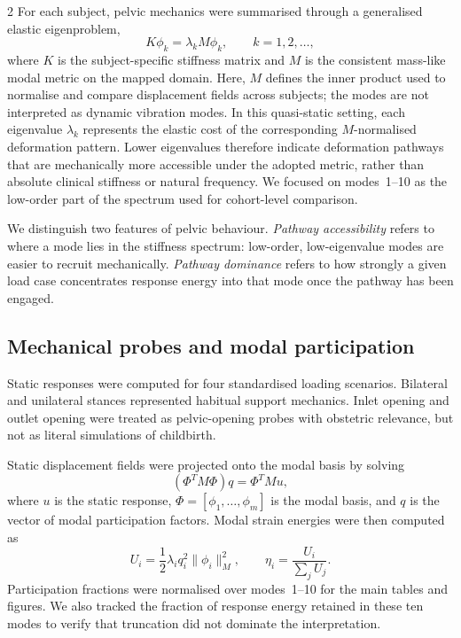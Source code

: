 \documentclass[openacc]{rsproca_new}
\begin{document}
\begin{multicols}{2}
For each subject, pelvic mechanics were summarised through a generalised elastic eigenproblem,
\begin{equation}
K\phi_{k} = \lambda_{k} M\phi_{k}, \qquad k=1,2,\ldots,
\end{equation}
where $K$ is the subject-specific stiffness matrix and $M$ is the consistent mass-like modal metric on the mapped domain. Here, $M$ defines the inner product used to normalise and compare displacement fields across subjects; the modes are not interpreted as dynamic vibration modes. In this quasi-static setting, each eigenvalue $\lambda_k$ represents the elastic cost of the corresponding $M$-normalised deformation pattern. Lower eigenvalues therefore indicate deformation pathways that are mechanically more accessible under the adopted metric, rather than absolute clinical stiffness or natural frequency. We focused on modes~1--10 as the low-order part of the spectrum used for cohort-level comparison.

We distinguish two features of pelvic behaviour. \emph{Pathway accessibility} refers to where a mode lies in the stiffness spectrum: low-order, low-eigenvalue modes are easier to recruit mechanically. \emph{Pathway dominance} refers to how strongly a given load case concentrates response energy into that mode once the pathway has been engaged.

\subsection{Mechanical probes and modal participation}

Static responses were computed for four standardised loading scenarios. Bilateral and unilateral stances represented habitual support mechanics. Inlet opening and outlet opening were treated as pelvic-opening probes with obstetric relevance, but not as literal simulations of childbirth.

Static displacement fields were projected onto the modal basis by solving
\begin{equation}
(\Phi^{T}M\Phi)q = \Phi^{T}Mu,
\end{equation}
where $u$ is the static response, $\Phi=[\phi_{1},\ldots,\phi_{m}]$ is the modal basis, and $q$ is the vector of modal participation factors. Modal strain energies were then computed as
\begin{equation}
U_{i}=\frac{1}{2}\lambda_{i}q_{i}^{2}\lVert\phi_{i}\rVert_{M}^{2}, \qquad
\eta_{i}=\frac{U_{i}}{\sum_{j}U_{j}}.
\end{equation}
Participation fractions were normalised over modes~1--10 for the main tables and figures. We also tracked the fraction of response energy retained in these ten modes to verify that truncation did not dominate the interpretation.


\end{multicols}
\end{document}
